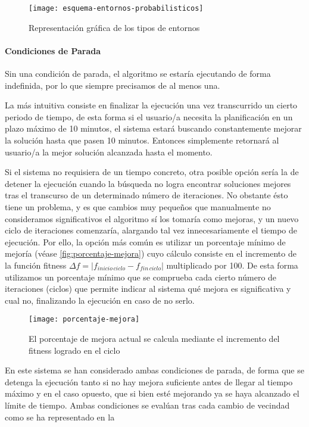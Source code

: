 \begin{figure}
	\centering	\texttt{[image: esquema-entornos-probabilisticos]}
	\caption{Representación gráfica de los tipos de entornos}
	\label{fig:esquema-entornos-probabilisticos}
\end{figure}


\paragraph{Condiciones de Parada}
\label{apartado:condiciones-parada}

Sin una condición de parada, el algoritmo se estaría ejecutando de forma indefinida, por lo que siempre precisamos de al menos una. 

La más intuitiva consiste en finalizar la ejecución una vez transcurrido un cierto periodo de tiempo, de esta forma si el usuario/a necesita la planificación en un plazo máximo de 10 minutos, el sistema estará buscando constantemente mejorar la solución hasta que pasen 10 minutos. Entonces simplemente retornará al usuario/a la mejor solución alcanzada hasta el momento.

Si el sistema no requisiera de un tiempo concreto, otra posible opción sería la de detener la ejecución cuando la búsqueda no logra encontrar soluciones mejores tras el transcurso de un determinado número de iteraciones. No obstante ésto tiene un problema, y es que cambios muy pequeños que manualmente no consideramos significativos el algoritmo sí los tomaría como mejoras, y un nuevo ciclo de iteraciones comenzaría, alargando tal vez innecesariamente el tiempo de ejecución. Por ello, la opción más común es utilizar un porcentaje mínimo de mejoría (véase \autoref{fig:porcentaje-mejora}) cuyo cálculo consiste en el incremento de la función fitness $\Delta f = |f_{inicio\, ciclo}-f_{fin\, ciclo}|$ multiplicado por 100. De esta forma utilizamos un porcentaje mínimo que se comprueba cada cierto número de iteraciones (ciclos) que permite indicar al sistema qué mejora es significativa y cual no, finalizando la ejecución en caso de no serlo.

\begin{figure}
	\centering
	\texttt{[image: porcentaje-mejora]}
	\caption{El porcentaje de mejora actual se calcula mediante el incremento del fitness logrado en el ciclo}
	\label{fig:porcentaje-mejora}
\end{figure}

En este sistema se han considerado ambas condiciones de parada, de forma que se detenga la ejecución tanto si no hay mejora suficiente antes de llegar al tiempo máximo y en el caso opuesto, que si bien esté mejorando ya se haya alcanzado el límite de tiempo. Ambas condiciones se evalúan tras cada cambio de vecindad como se ha representado en la %

